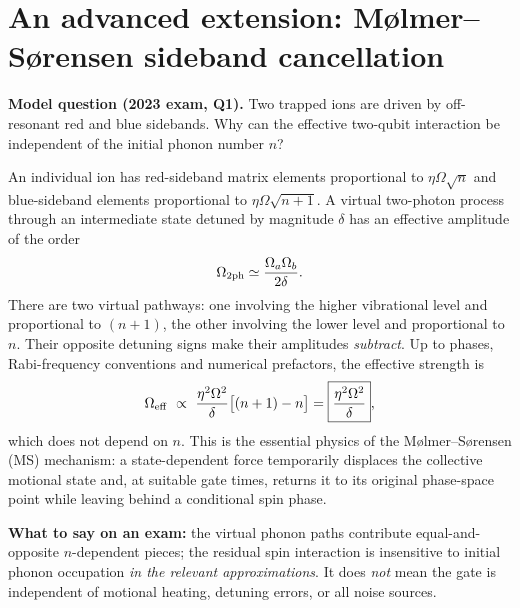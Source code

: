 \section{An advanced extension: M\o lmer--S\o rensen sideband cancellation}\label{sec:mssol}
\textbf{Model question (2023 exam, Q1).} Two trapped ions are driven by off-resonant red and blue sidebands. Why can the effective two-qubit interaction be independent of the initial phonon number $n$?

An individual ion has red-sideband matrix elements proportional to $\eta\Omega\sqrt n$ and blue-sideband elements proportional to $\eta\Omega\sqrt{n+1}$. A virtual two-photon process through an intermediate state detuned by magnitude $\delta$ has an effective amplitude of the order
\begin{equation}
\Omega_{\rm 2ph}\simeq\frac{\Omega_a\Omega_b}{2\delta}.
\end{equation}
There are two virtual pathways: one involving the higher vibrational level and proportional to $(n+1)$, the other involving the lower level and proportional to $n$. Their opposite detuning signs make their amplitudes \emph{subtract}. Up to phases, Rabi-frequency conventions and numerical prefactors, the effective strength is
\begin{equation}
\Omega_{\rm eff}\ \propto\ \frac{\eta^2\Omega^2}{\delta}\big[(n+1)-n\big]
=\boxed{\frac{\eta^2\Omega^2}{\delta}},\label{eq:mscancellation}
\end{equation}
which does not depend on $n$. This is the essential physics of the M\o lmer--S\o rensen (MS) mechanism: a state-dependent force temporarily displaces the collective motional state and, at suitable gate times, returns it to its original phase-space point while leaving behind a conditional spin phase.

\textbf{What to say on an exam:} the virtual phonon paths contribute equal-and-opposite $n$-dependent pieces; the residual spin interaction is insensitive to initial phonon occupation \emph{in the relevant approximations}. It does \emph{not} mean the gate is independent of motional heating, detuning errors, or all noise sources.

